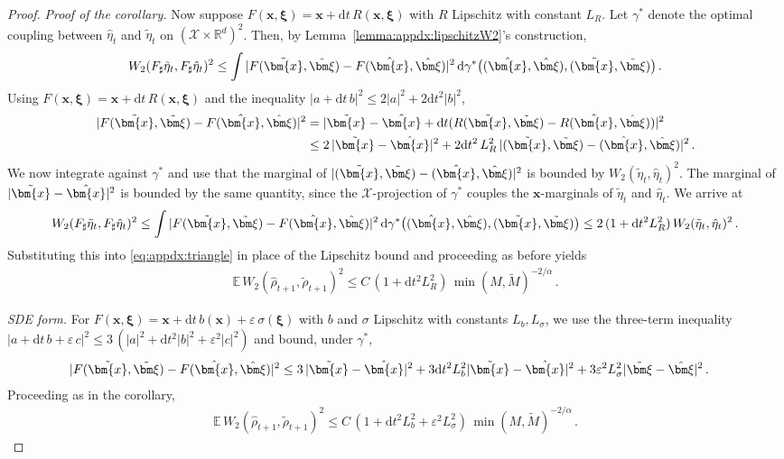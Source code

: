 \documentclass{article}
\theoremstyle{plain}
\theoremstyle{definition}
\theoremstyle{remark}
\newcommand{\bfxi}{{\bm \xi}}
\newcommand{\x}{\bm{x}}
\newcommand{\bfx}{\bm{x}}
\newcommand{\bR}{\mathbb{R}}
\newcommand{\rd}{\mathrm{d}}
\begin{document}
\begin{proof}
  \emph{Proof of the corollary.} Now suppose $F(\x,\bfxi) = \x + \rd t\, R(\x,\bfxi)$ with $R$ Lipschitz with constant $L_R$. Let $\gamma^*$ denote the optimal coupling between $\hat\eta_t$ and $\tilde\eta_t$ on $(\mathcal X \times \bR^d)^2$. Then, by Lemma~\ref{lemma:appdx:lipschitzW2}'s construction,
  \begin{align}
    W_2( F_\sharp \tilde\eta_t, F_\sharp \hat\eta_t )^2
    \leq \int |F(\tilde\x,\tilde\bfxi) - F(\hat\x,\hat\bfxi)|^2 \, \rd\gamma^*\big((\hat\x,\hat\bfxi),(\tilde\x,\tilde\bfxi)\big)\,.
  \end{align}
  Using $F(\x,\bfxi) = \x + \rd t\, R(\x,\bfxi)$ and the inequality $|a+\rd t\, b|^2 \leq 2|a|^2 + 2\rd t^2 |b|^2$,
  \begin{align}
    |F(\tilde\x,\tilde\bfxi) - F(\hat\x,\hat\bfxi)|^2
    &= |\tilde\x - \hat\x + \rd t (R(\tilde\x,\tilde\bfxi) - R(\hat\x,\hat\bfxi))|^2 \\
    &\leq 2\,|\tilde\x - \hat\x|^2 + 2\rd t^2\, L_R^2\,|(\tilde\x,\tilde\bfxi) - (\hat\x,\hat\bfxi)|^2\,.
  \end{align}
  We now integrate against $\gamma^*$ and use that the marginal of $|(\tilde\x,\tilde\bfxi) - (\hat\x,\hat\bfxi)|^2$ is bounded by $W_2(\tilde\eta_t,\hat\eta_t)^2$. The marginal of $|\tilde\x - \hat\x|^2$ is bounded by the same quantity, since the $\mathcal X$-projection of $\gamma^*$ couples the $\bfx$-marginals of $\tilde\eta_t$ and $\hat\eta_t$. We arrive at 
  \begin{align}
    W_2( F_\sharp \tilde\eta_t, F_\sharp \hat\eta_t )^2 \leq \int |F(\tilde\x,\tilde\bfxi) - F(\hat\x,\hat\bfxi)|^2 \, \rd\gamma^*\big((\hat\x,\hat\bfxi),(\tilde\x,\tilde\bfxi)\big)  \leq 2\, (1 + \rd t^2 L_R^2) \, W_2(\tilde\eta_t,\hat\eta_t)^2\,.
  \end{align}
  Substituting this into \eqref{eq:appdx:triangle} in place of the Lipschitz bound and proceeding as before yields
  \begin{align}
    \mathbb E\,W_2( \hat\rho_{t+1}, \tilde\rho_{t+1} )^2 \leq C\,(1 + \rd t^2 L_R^2)\, \min(M,\tilde M)^{-2/\alpha}\,.
  \end{align}

  \emph{SDE form.} For $F(\x,\bfxi) = \x + \rd t\, b(\x) + \varepsilon\, \sigma(\bfxi)$ with $b$ and $\sigma$ Lipschitz with constants $L_b, L_\sigma$, we use the three-term inequality $|a + \rd t\, b + \varepsilon\, c|^2 \leq 3\,(|a|^2 + \rd t^2|b|^2 + \varepsilon^2|c|^2)$ and bound, under $\gamma^*$,
  \begin{align}
    |F(\tilde\x,\tilde\bfxi) - F(\hat\x,\hat\bfxi)|^2 &\leq 3\,|\tilde\x - \hat\x|^2 + 3\rd t^2 L_b^2 |\tilde\x - \hat\x|^2 + 3\varepsilon^2 L_\sigma^2 |\tilde\bfxi - \hat\bfxi|^2\,.
  \end{align}
  Proceeding as in the corollary,
  \begin{align}
    \mathbb E\,W_2( \hat\rho_{t+1}, \tilde\rho_{t+1} )^2 \leq C\,(1 + \rd t^2 L_b^2 + \varepsilon^2 L_\sigma^2)\, \min(M,\tilde M)^{-2/\alpha}\,.
  \end{align}
\end{proof}
\end{document}

